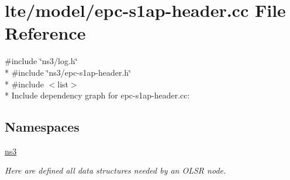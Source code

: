 \hypertarget{epc-s1ap-header_8cc}{}\section{lte/model/epc-\/s1ap-\/header.cc File Reference}
\label{epc-s1ap-header_8cc}
{\ttfamily \#include \char`\"{}ns3/log.\+h\char`\"{}}\\*
{\ttfamily \#include \char`\"{}ns3/epc-\/s1ap-\/header.\+h\char`\"{}}\\*
{\ttfamily \#include $<$list$>$}\\*
Include dependency graph for epc-\/s1ap-\/header.cc\+:
\subsection*{Namespaces}
\begin{DoxyCompactItemize}
\item 
 \hyperlink{namespacens3}{ns3}
\begin{DoxyCompactList}\small\item\em Here are defined all data structures needed by an O\+L\+SR node. \end{DoxyCompactList}\end{DoxyCompactItemize}
